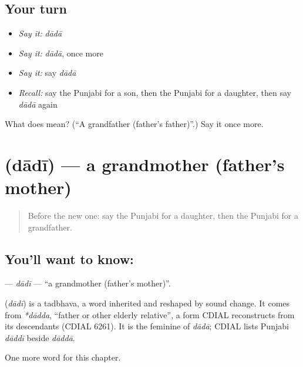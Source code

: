 \subsection*{Your turn}
\begin{itemize}
\raggedright
  \item \emph{Say it:} \emph{dādā}
  \item \emph{Say it:} \emph{dādā}, once more
  \item \emph{Say it:} say \emph{dādā}
  \item \emph{Recall:} say the Punjabi for a son, then the Punjabi for a daughter, then say \emph{dādā} again
\end{itemize}

\begin{tcolorbox}[breakable,colback=teal!4,colframe=teal!35!black,title={Before you move on}]
What does  mean? (\textquotedblleft{}A grandfather (father's father)\textquotedblright{}.) Say it once more.
\end{tcolorbox}
\section[\texorpdfstring{\pa{ਦਾਦੀ} (dādī)}{ਦਾਦੀ (dādī)}]{ (dādī) — a grandmother (father's mother)}

\label{lesson:PA-C54-dadi}



\begin{quote}
Before the new one: say the Punjabi for a daughter, then the Punjabi for a grandfather.
\end{quote}

\subsection*{You'll want to know: }
\textbf{} — \emph{dādī} — \textquotedblleft{}a grandmother (father's mother)\textquotedblright{}.

\begin{cousinweb}
\textbf{} (\emph{dādī}) is a tadbhava, a word inherited and reshaped by sound change. It comes from \emph{*dādda}, \textquotedblleft{}father or other elderly relative\textquotedblright{}, a form CDIAL reconstructs from its descendants (CDIAL 6261). It is the feminine of \emph{dādā}; CDIAL lists Punjabi \emph{dāddī} beside \emph{dāddā}.
\end{cousinweb}

\begin{grammarlens}[title={What you've built}]
One more word for this chapter.
\end{grammarlens}

